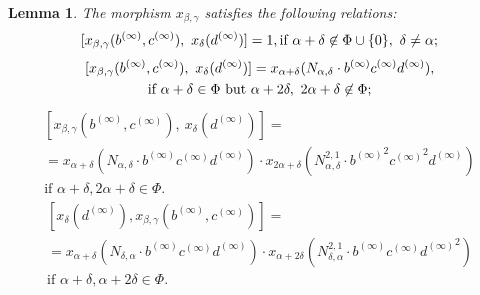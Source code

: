 \documentclass[oneside, 11pt]{amsart}
\numberwithin{equation}{section}
\newtheorem{lemma}{Lemma} \numberwithin{lemma}{section}
\theoremstyle{definition}
\theoremstyle{remark}
\begin{document}
\begin{lemma} \label{lem:elim-lhs}
 The morphism $x_{\beta, \gamma}$ satisfies the following relations:
 \begin{multline} \label{R2-bg}
  [x_{\beta, \gamma}(b^{(\infty)}, c^{(\infty)}),\ x_\delta(d^{(\infty)})] = 1, \hfill \text{if $\alpha + \delta \not\in\Phi \cup \{0\},\ \delta\neq\alpha;$}
 \end{multline}
 \begin{multline} \label{R3-bg}
   [x_{\beta, \gamma}(b^{(\infty)}, c^{(\infty)}),\ x_\delta(d^{(\infty)})] = x_{\alpha + \delta}(N_{\alpha,\delta} \cdot b^{(\infty)}c^{(\infty)}d^{(\infty)}), \hfill \\ \text{if $\alpha+\delta\in\Phi$ but $\alpha+2\delta,\ 2\alpha+\delta\not\in\Phi;$}
 \end{multline}
 {\setlength{\abovedisplayskip}{0pt} \setlength{\belowdisplayskip}{0pt}
 \begin{multline} \label{R4-bg1}
  [x_{\beta, \gamma}(b^{(\infty)}, c^{(\infty)}),\ x_\delta(d^{(\infty)})] = \\ = x_{\alpha + \delta}(N_{\alpha,\delta} \cdot b^{(\infty)}c^{(\infty)}d^{(\infty)}) \cdot  x_{2\alpha+\delta}(N_{\alpha,\delta}^{2,1} \cdot {b^{(\infty)}}^2{c^{(\infty)}}^2d^{(\infty)}) \\
  \text{if $\alpha+\delta,2\alpha+\delta\in\Phi.$}
 \end{multline} 
 \begin{multline} \label{R4-bg2}
  [x_\delta(d^{(\infty)}), x_{\beta, \gamma}(b^{(\infty)}, c^{(\infty)})] = \\ = x_{\alpha + \delta}(N_{\delta, \alpha} \cdot b^{(\infty)}c^{(\infty)}d^{(\infty)}) \cdot x_{\alpha+2\delta}(N_{\delta, \alpha}^{2,1} \cdot {b^{(\infty)}}{c^{(\infty)}}{d^{(\infty)}}^2) \\
  \text{if $\alpha+\delta,\alpha+2\delta\in\Phi.$}
 \end{multline}}
\end{lemma}
\end{document}
